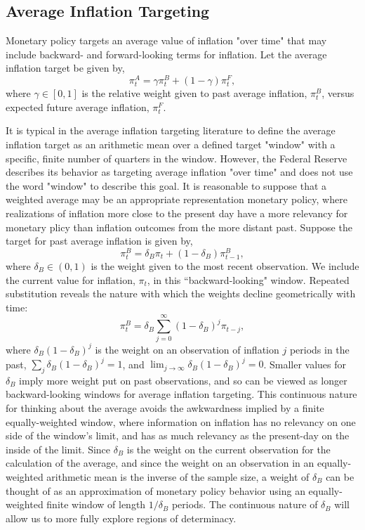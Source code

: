 \documentclass[english,authoryear,12pt]{elsarticle}
\begin{document}
\subsection{Average Inflation Targeting}

Monetary policy targets an average value of inflation "over time" that may include backward- and forward-looking terms for inflation. Let the average inflation target be given by,
\begin{equation}
	\pi_t^A = \gamma \pi_t^B + (1-\gamma) \pi_t^F,
\end{equation}
where $\gamma \in [0,1]$ is the relative weight given to past average inflation, $\pi_t^B$, versus expected future average inflation, $\pi_t^F$. 

It is typical in the average inflation targeting literature to define the average inflation target as an arithmetic mean over a defined target "window" with a specific, finite number of quarters in the window. However, the Federal Reserve describes its behavior as targeting average inflation "over time" and does not use the word "window" to describe this goal. It is reasonable to suppose that a weighted average may be an appropriate representation monetary policy, where realizations of inflation more close to the present day have a more relevancy for monetary plicy than inflation outcomes from the more distant past. Suppose the target for past average inflation is given by,
\begin{equation}\label{eq:backward}
	\pi_t^B = \delta_B \pi_t + (1-\delta_B) \pi_{t-1}^B,
\end{equation}
where $\delta_B \in (0,1)$ is the weight given to the most recent observation. We include the current value for inflation, $\pi_t$, in this ``backward-looking" window.  Repeated substitution reveals the nature with which the weights decline geometrically with time:
\begin{equation}\label{eq:backward_all}
	\pi_t^B = \delta_B \sum_{j=0}^{\infty} (1-\delta_B)^j \pi_{t-j},
\end{equation}
where $\delta_B (1-\delta_B)^j$ is the weight on an observation of inflation $j$ periods in the past, $\sum_j \delta_B (1-\delta_B)^j=1$, and $\lim_{j \to \infty} \delta_B (1-\delta_B)^j=0$. Smaller values for $\delta_B$ imply more weight put on past observations, and so can be viewed as longer backward-looking windows for average inflation targeting. This continuous nature for thinking about the average avoids the awkwardness implied by a finite equally-weighted window, where information on inflation has no relevancy on one side of the window's limit, and has as much relevancy as the present-day on the inside of the limit. Since $\delta_B$ is the weight on the current observation for the calculation of the average, and since the weight on an observation in an equally-weighted arithmetic mean is the inverse of the sample size, a weight of $\delta_B$ can be thought of as an approximation of monetary policy behavior using an equally-weighted finite window of length $1 / \delta_B$ periods. The continuous nature of $\delta_B$ will allow us to more fully explore regions of determinacy.
\end{document}
